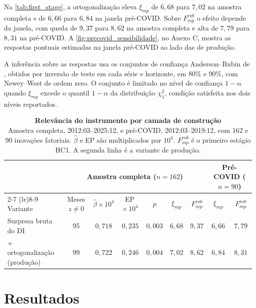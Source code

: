 \documentclass[preprint,authoryear,review,12pt]{elsarticle}
\begin{document}
Na \autoref{tab:first_stage}, a ortogonalização eleva $\xi_{mp}$ de $6{,}68$ para $7{,}02$ na amostra completa e de $6{,}66$ para $6{,}84$ na janela pré-COVID. Sobre $F^{rob}_{mp}$ o efeito depende da janela, com queda de $9{,}37$ para $8{,}62$ na amostra completa e alta de $7{,}79$ para $8{,}31$ na pré-COVID. A \autoref{fig:precovid_sensibilidade}, no Anexo C, mostra as respostas pontuais estimadas na janela pré-COVID ao lado das de produção.

A inferência sobre as respostas usa os conjuntos de confiança Anderson--Rubin de \cite{montielolea}, obtidos por inversão de teste em cada série e horizonte, em 80\% e 90\%, com Newey--West de ordem zero. O conjunto é limitado no nível de confiança $1-\alpha$ quando $\xi_{mp}$ excede o quantil $1-\alpha$ da distribuição $\chi^2_1$, condição satisfeita nos dois níveis reportados.


\begin{table}[H]
\begin{center}
\footnotesize
\setlength{\tabcolsep}{5pt}
\begin{tabular}{@{}l c c c c c c c c@{}}
\toprule
 & \multicolumn{6}{c}{Amostra completa ($n = 162$)} & \multicolumn{2}{c}{Pré-COVID ($n = 90$)} \\
\cmidrule(lr){2-7} \cmidrule(lr){8-9}
Variante & Meses $z \neq 0$ & $\hat{\beta} \times 10^{4}$ & EP\,$\times\,10^{4}$ & $p$ & $\xi_{mp}$ & $F^{rob}_{mp}$ & $\xi_{mp}$ & $F^{rob}_{mp}$ \\
\midrule
Surpresa bruta do DI                    & 95 & $0{,}718$ & $0{,}235$ & $0{,}003$ & $6{,}68$ & $9{,}37$  & $6{,}66$ & $7{,}79$ \\
\quad + ortogonalização (produção)      & 99 & $0{,}722$ & $0{,}246$ & $0{,}004$ & $7{,}02$ & $8{,}62$  & $6{,}84$ & $8{,}31$ \\
\bottomrule
\end{tabular}
\caption{\textbf{Relevância do instrumento por camada de construção}\\{Amostra completa, 2012:03--2025:12, e pré-COVID, 2012:03--2019:12, com 162 e 90 inovações fatoriais. $\hat{\beta}$ e EP são multiplicados por $10^4$. $F^{rob}_{mp}$ é o primeiro estágio HC1. A segunda linha é a variante de produção.}}
\label{tab:first_stage}
\end{center}
\end{table}



\section{Resultados}
\label{sec:resultados}
\end{document}
